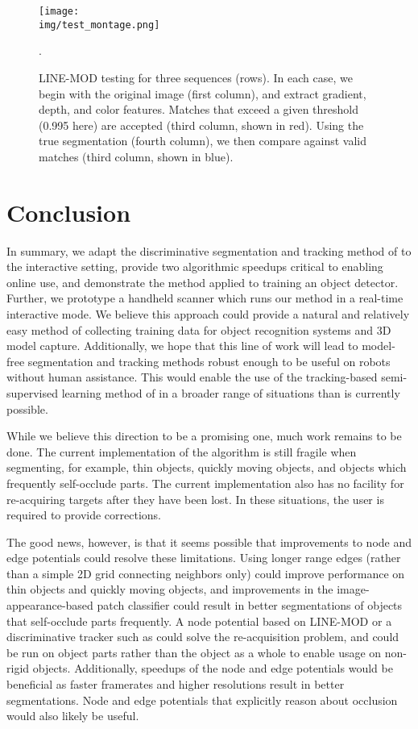 \documentclass[conference]{IEEEtran}
\newcommand{\img}{img}
\begin{document}
\begin{figure}
  \centering
  \texttt{[image: \\img/test\_montage.png]}
  \caption{\small{LINE-MOD testing for three sequences (rows).  In each case, we begin with the original image (first column), and extract gradient, depth, and color features.  Matches that exceed a given threshold (0.995 here) are accepted (third column, shown in red).  Using the true segmentation (fourth column), we then compare against valid matches (third column, shown in blue).}}.
  \label{fig:test_linemod}
  \end{figure}

\section{Conclusion} 
\label{sec:conclusion}

In summary, we adapt the discriminative segmentation and tracking method of \cite{teichman2012a} to the interactive setting, provide two algorithmic speedups critical to enabling online use, and demonstrate the method applied to training an object detector.  Further, we prototype a handheld scanner which runs our method in a real-time interactive mode.  We believe this approach could provide a natural and relatively easy method of collecting training data for object recognition systems and 3D model capture.  Additionally, we hope that this line of work will lead to model-free segmentation and tracking methods robust enough to be useful on robots without human assistance.  This would enable the use of the tracking-based semi-supervised learning method of \citet{teichman2011b} in a broader range of situations than is currently possible.

While we believe this direction to be a promising one, much work remains to be done.  The current implementation of the algorithm is still fragile when segmenting, for example, thin objects, quickly moving objects, and objects which frequently self-occlude parts. The current implementation also has no facility for re-acquiring targets after they have been lost.  In these situations, the user is required to provide corrections.

The good news, however, is that it seems possible that improvements to node and edge potentials could resolve these limitations.  Using longer range edges (rather than a simple 2D grid connecting neighbors only) could improve performance on thin objects and quickly moving objects, and improvements in the image-appearance-based patch classifier could result in better segmentations of objects that self-occlude parts frequently.  A node potential based on LINE-MOD or a discriminative tracker such as \citet{kalal2010a} could solve the re-acquisition problem, and could be run on object parts rather than the object as a whole to enable usage on non-rigid objects.  Additionally, speedups of the node and edge potentials would be beneficial as faster framerates and higher resolutions result in better segmentations.  Node and edge potentials that explicitly reason about occlusion would also likely be useful.
\end{document}
